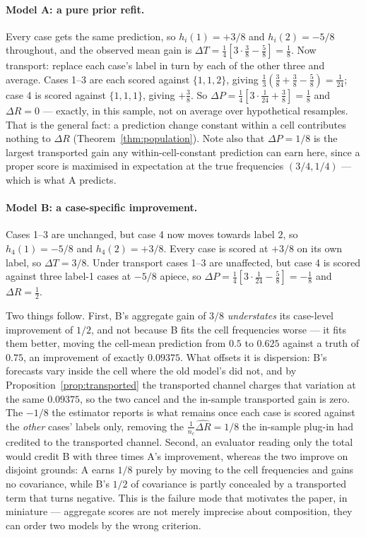 \paragraph{Model A: a pure prior refit.}
Every case gets the same prediction, so $h_i(1)=+3/8$ and $h_i(2)=-5/8$ throughout, and the
observed mean gain is $\Delta T=\tfrac14[3\cdot\tfrac38-\tfrac58]=\tfrac18$. Now transport:
replace each case's label in turn by each of the other three and average. Cases 1--3 are
each scored against $\{1,1,2\}$, giving $\tfrac13(\tfrac38+\tfrac38-\tfrac58)=\tfrac1{24}$;
case 4 is scored against $\{1,1,1\}$, giving $+\tfrac38$. So
$\Delta P=\tfrac14[3\cdot\tfrac1{24}+\tfrac38]=\tfrac18$ and $\Delta R=0$ --- exactly, in
this sample, not on average over hypothetical resamples. That is the general fact: a
prediction change constant within a cell contributes nothing to $\Delta R$
(Theorem~\ref{thm:population}). Note also that $\Delta P=1/8$ is the largest transported
gain any within-cell-constant prediction can earn here, since a proper score is maximised in
expectation at the true frequencies $(3/4,1/4)$ --- which is what A predicts.

\paragraph{Model B: a case-specific improvement.}
Cases 1--3 are unchanged, but case 4 now moves towards label $2$, so $h_4(1)=-5/8$ and
$h_4(2)=+3/8$. Every case is scored at $+3/8$ on its own label, so $\Delta T=3/8$. Under
transport cases 1--3 are unaffected, but case 4 is scored against three label-1 cases at
$-5/8$ apiece, so $\Delta P=\tfrac14[3\cdot\tfrac1{24}-\tfrac58]=-\tfrac18$ and
$\Delta R=\tfrac12$.

Two things follow. First, B's aggregate gain of $3/8$ \emph{understates} its case-level
improvement of $1/2$, and not because B fits the cell frequencies worse --- it fits them
better, moving the cell-mean prediction from $0.5$ to $0.625$ against a truth of $0.75$, an
improvement of exactly $0.09375$. What offsets it is dispersion: B's forecasts vary inside
the cell where the old model's did not, and by Proposition~\ref{prop:transported} the
transported channel charges that variation at the same $0.09375$, so the two cancel and the
in-sample transported gain is zero. The $-1/8$ the estimator reports is what remains once
each case is scored against the \emph{other} cases' labels only, removing the
$\tfrac1{n_c}\widehat{\Delta R}=1/8$ the in-sample plug-in had credited to the transported
channel. Second, an evaluator reading only the total would credit B with three times A's
improvement, whereas the two improve on disjoint grounds: A earns $1/8$ purely by moving to
the cell frequencies and gains no covariance, while B's $1/2$ of covariance is partly
concealed by a transported term that turns negative. This is the failure mode that motivates
the paper, in miniature --- aggregate scores are not merely imprecise about composition, they
can order two models by the wrong criterion.

